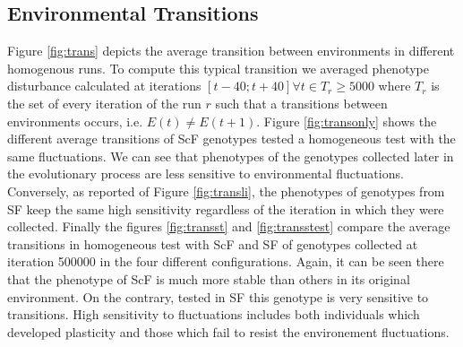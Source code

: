\subsection{Environmental Transitions} 
Figure \ref{fig:trans} depicts the average transition between environments in different homogenous runs. To compute this typical transition we averaged phenotype disturbance calculated at iterations $[t-40; t + 40] \forall t \in T_r	
\ge 5000$ where $T_r$ is the set of every iteration of the run $r$ such that a transitions between environments occurs, i.e. $E(t) \ne E(t+1)$. Figure  \ref{fig:transonly} shows the different average transitions of ScF genotypes tested a homogeneous test with the same fluctuations. We can see that phenotypes of the genotypes collected later in the evolutionary process are less sensitive to environmental fluctuations. Conversely, as reported of Figure \ref{fig:transli}, the phenotypes of genotypes from SF keep the same high sensitivity regardless of the iteration in which they were collected. Finally the figures \ref{fig:transst} and \ref{fig:transstest} compare the average transitions in homogeneous test with ScF and SF of genotypes collected at iteration 500000 in the four different configurations. Again, it can be seen there that the phenotype of ScF is much more stable than others in its original environment. On the contrary, tested in SF this genotype is very sensitive to transitions. High sensitivity to fluctuations includes both individuals which developed plasticity and those which fail to resist the environement fluctuations.


